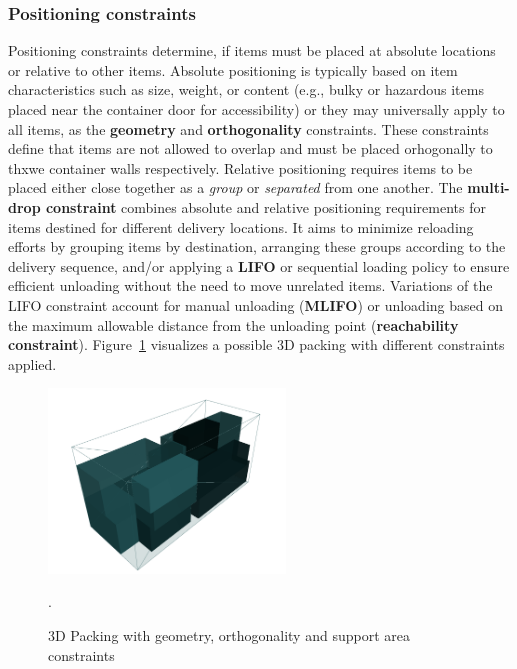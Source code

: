 \subsubsection{Positioning constraints}

Positioning constraints determine, if items must be placed at
absolute locations or relative to other items. Absolute positioning is
typically based on item characteristics such as size, weight, or
content (e.g., bulky or hazardous items placed near the container door for accessibility) or
they may universally apply to all items, as the \textbf{geometry} and
\textbf{orthogonality} constraints. These constraints define that items are not allowed to overlap
and must be placed orhogonally to thxwe container walls respectively.
Relative positioning requires items to be placed either close together as a \textit{group} or
\textit{separated} from one another.
The \textbf{multi-drop constraint} combines absolute and relative positioning requirements for items
destined for different delivery locations. It aims to minimize reloading efforts by grouping items
by destination, arranging these groups according to the delivery sequence, and/or applying a \textbf{\gls{LIFO}} or
sequential loading policy to ensure efficient unloading without the need to move unrelated items.
Variations of the \gls{LIFO} constraint account for manual unloading (\textbf{\gls{MLIFO}}) or unloading based on the
maximum allowable distance from the unloading point (\textbf{reachability constraint}). Figure~\ref{fig:solution-visualization}
visualizes a possible 3D packing with different constraints applied.

\begin{figure}[ht]
    \centering
    \includegraphics[width=6.3cm]{pictures/3l_cvrp_example.png}
    \caption[Visualized 3D packing with packing constraints]{3D Packing with geometry, orthogonality and support area constraints\footnotemark}.
    \label{fig:solution-visualization}
\end{figure}

